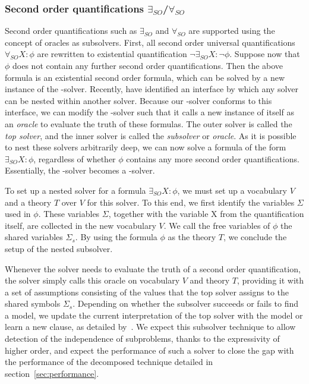 \subsubsection{Second order quantifications $\exists_{SO}$/$\forall_{SO}$}
Second order quantifications such as $\exists_{SO}$ and $\forall_{SO}$ are supported using the concept of oracles as subsolvers.
First, all second order universal quantifications $\forall_{SO} X : \phi$ are rewritten to existential quantification $\neg \exists_{SO} X : \neg \phi$.
Suppose now that $\phi$ does not contain any further second order quantifications.
Then the above formula is an existential second order formula, which can be solved by a new instance of the \NP-solver.
Recently, \cite{AAAIW1612603} have identified an interface by which any solver can be nested within another solver.
Because our \NP-solver conforms to this interface, we can modify the \NP-solver such that it calls a new instance of itself as an \emph{oracle} to evaluate the truth of these formulas.
The outer solver is called the \emph{top solver}, and the inner solver is called the \emph{subsolver} or \emph{oracle}.
As it is possible to nest these solvers arbitrarily deep, we can now solve a formula of the form $\exists_{SO} X : \phi$, regardless of whether $\phi$ contains any more second order quantifications.
Essentially, the \NP-solver becomes a \QBF-solver.

To set up a nested solver for a formula $\exists_{SO} X : \phi$, we must set up a vocabulary $V$ and a theory $T$ over $V$ for this solver. 
To this end, we first identify the variables $\Sigma$ used in $\phi$.
These variables $\Sigma$, together with the variable X from the quantification itself, are collected in the new vocabulary $V$. 
We call the free variables of $\phi$ the shared variables $\Sigma_s$.
By using the formula $\phi$ as the theory $T$, we conclude the setup of the nested subsolver.

Whenever the solver needs to evaluate the truth of a second order quantification, the solver simply calls this oracle on vocabulary $V$ and theory $T$, providing it with a set of assumptions consisting of the values that the top solver assigns to the shared symbols $\Sigma_s$.
Depending on whether the subsolver succeeds or fails to find a model, we update the current interpretation of the top solver with the model or learn a new clause, as detailed by~\cite{AAAIW1612603}.
We expect this subsolver technique to allow detection of the independence of subproblems, thanks to the expressivity of higher order, and expect the performance of such a solver to close the gap with the performance of the decomposed technique detailed in section~\ref{sec:performance}.

